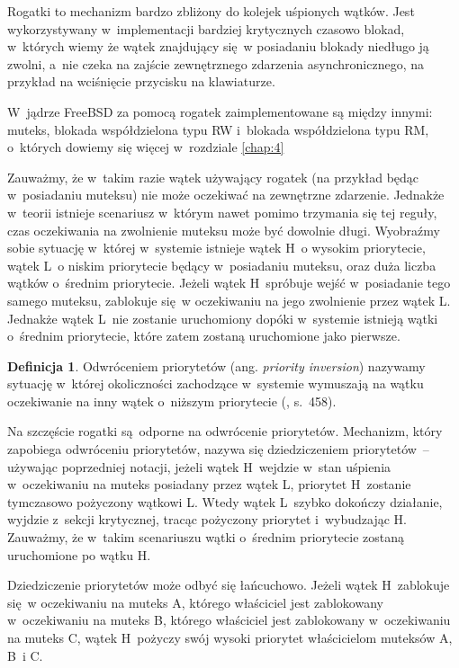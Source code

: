 \documentclass[shortabstract]{iithesis}
\theoremstyle{definition} \newtheorem*{definition}{Definicja}
\theoremstyle{definition} \newtheorem*{example}{Przykład}
\theoremstyle{definition} \newtheorem*{remark}{Uwaga}
\begin{document}
Rogatki to mechanizm bardzo zbliżony do kolejek uśpionych wątków. Jest wykorzystywany w~implementacji bardziej
krytycznych czasowo blokad, w~których wiemy że wątek znajdujący się w posiadaniu blokady
niedługo ją zwolni, a~nie czeka na zajście zewnętrznego zdarzenia asynchronicznego, na przykład
na wciśnięcie przycisku na klawiaturze.

W~jądrze FreeBSD za pomocą rogatek zaimplementowane są między innymi: muteks, blokada współdzielona typu RW
i~blokada współdzielona typu RM, o~których dowiemy się więcej
w~rozdziale \ref{chap:4}

Zauważmy, że w~takim razie wątek używający rogatek (na przykład będąc w~posiadaniu muteksu) nie może oczekiwać na
zewnętrzne zdarzenie. Jednakże w~teorii istnieje scenariusz w~którym nawet pomimo trzymania się tej reguły,
czas oczekiwania na zwolnienie muteksu może być dowolnie długi. Wyobraźmy sobie sytuację w~której
w~systemie istnieje wątek H~o wysokim priorytecie, wątek L~o niskim priorytecie będący w~posiadaniu
muteksu, oraz duża liczba wątków o~średnim priorytecie. Jeżeli wątek H~spróbuje wejść w~posiadanie
tego samego muteksu, zablokuje się w oczekiwaniu na jego zwolnienie przez wątek L. Jednakże wątek L~nie zostanie
uruchomiony dopóki w~systemie istnieją wątki o~średnim priorytecie, które zatem zostaną uruchomione jako
pierwsze.

\begin{definition}
Odwróceniem priorytetów (ang. \textit{priority inversion}) nazywamy sytuację w~której okoliczności zachodzące
w~systemie wymuszają na wątku oczekiwanie na inny wątek o~niższym priorytecie (\cite{bib:stallings}, s.~458).
\end{definition}

Na szczęście rogatki są odporne na odwrócenie priorytetów. Mechanizm, który zapobiega odwróceniu priorytetów, nazywa
się dziedziczeniem priorytetów~-- używając poprzedniej notacji, jeżeli wątek H~wejdzie w~stan uśpienia
w~oczekiwaniu na muteks posiadany przez wątek L, priorytet H~zostanie tymczasowo pożyczony wątkowi L.
Wtedy wątek L~szybko dokończy działanie, wyjdzie z~sekcji krytycznej, tracąc pożyczony priorytet i~wybudzając H.
Zauważmy, że w~takim scenariuszu wątki o~średnim priorytecie zostaną uruchomione po wątku H.

Dziedziczenie priorytetów może odbyć się łańcuchowo. Jeżeli wątek H~zablokuje się w oczekiwaniu na
muteks A, którego właściciel jest zablokowany w~oczekiwaniu na muteks B, którego właściciel jest zablokowany
w~oczekiwaniu na muteks C, wątek H~pożyczy swój wysoki priorytet właścicielom muteksów A, B~i C.
\end{document}
